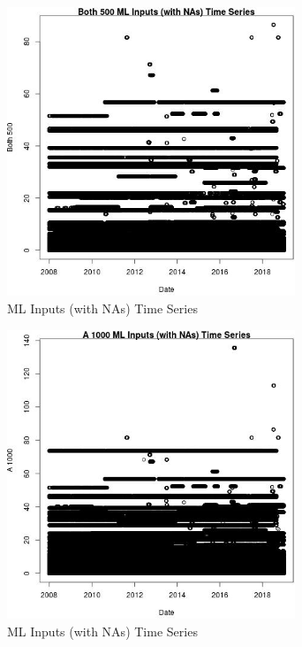 \begin{figure} 
\centering  
\includegraphics[width=0.77\textwidth]{Code_Outputs/Report_ML_input_PM25_Step4_part_f_de_duplicated_aveswNAs_Both_500vDate.jpg} 
\caption{\label{fig:Report_ML_input_PM25_Step4_part_f_de_duplicated_aveswNAsBoth_500vDate}ML Inputs (with NAs) Time Series} 
\end{figure} 
 

\clearpage 

\begin{figure} 
\centering  
\includegraphics[width=0.77\textwidth]{Code_Outputs/Report_ML_input_PM25_Step4_part_f_de_duplicated_aveswNAs_A_1000vDate.jpg} 
\caption{\label{fig:Report_ML_input_PM25_Step4_part_f_de_duplicated_aveswNAsA_1000vDate}ML Inputs (with NAs) Time Series} 
\end{figure} 
 

